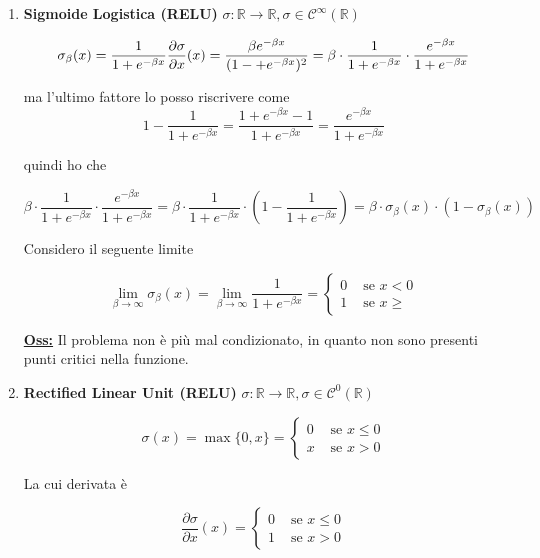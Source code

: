\documentclass[a4paper,12pt]{article}
\newcommand{\osservazione}{\noindent\textbf{\underline{Oss:}} }
\begin{document}
	\begin{enumerate}
		\item \textbf{Sigmoide Logistica (RELU)} $ \sigma : \mathbb{R} \rightarrow \mathbb{R}, \sigma \in \mathcal{C}^\infty(\mathbb{R})$

		\[
		\sigma_\beta(x) = \frac{1}{1 + e^{- \beta x}} \\
		\frac{\partial \sigma}{\partial x}(x) = \frac{\beta e^{- \beta x}}{(1 -+ e^{- \beta x})^2} = \beta \cdot  \frac{1}{1 + e^{- \beta x}} \cdot  \frac{ e^{- \beta x}}{1 + e^{- \beta x}}
		\]

		ma l'ultimo fattore lo posso riscrivere come
		\[
		1 -  \frac{1}{1 + e^{- \beta x}} =  \frac{ 1 + e^{- \beta x} - 1}{1 + e^{- \beta x}} =  \frac{e^{- \beta x}}{1 + e^{- \beta x}}
		\]

		quindi ho che

		\[
		\beta \cdot  \frac{1}{1 + e^{- \beta x}} \cdot  \frac{ e^{- \beta x}}{1 + e^{- \beta x}} = \beta \cdot  \frac{1}{1 + e^{- \beta x}} \cdot (1 -  \frac{1}{1 + e^{- \beta x}}) = \beta \cdot \sigma_\beta(x) \cdot (1 - \sigma_\beta(x))
		\]

		Considero il seguente limite

		\[
		\lim_{\beta \rightarrow \infty} \sigma_\beta(x) = \lim_{\beta \rightarrow \infty} \frac{1}{1 + e^{- \beta x}} = \begin{cases}
			0 & \text{ se } x < 0 \\
			1 & \text{ se } x \geq
		\end{cases}
		\]

		\osservazione Il problema non è più mal condizionato, in quanto non sono presenti punti critici nella funzione.

		\item \textbf{Rectified Linear Unit (RELU)} $\sigma : \mathbb{R} \rightarrow \mathbb{R}, \sigma \in \mathcal{C}^0(\mathbb{R})$

		\[
		\sigma (x) = \max \{0,x\} = \begin{cases}
			0 & \text{ se } x \leq 0 \\
			x & \text{ se } x > 0
		\end{cases}
		\]

		La cui derivata è

		\[
		\frac{\partial \sigma}{\partial x} (x) = \begin{cases}
			0 & \text{ se } x \leq 0 \\
			1 & \text{ se } x > 0
		\end{cases}
		\]


\end{enumerate}
\end{document}
